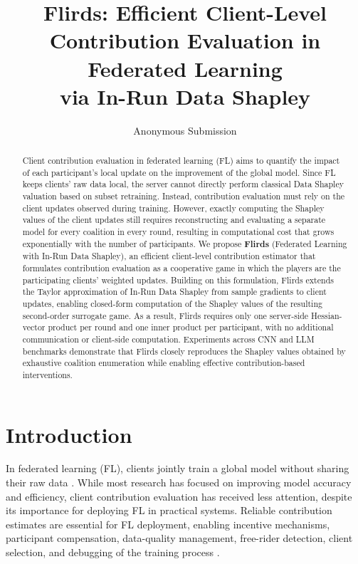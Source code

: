 \documentclass[letterpaper]{article} %
\title{Flirds: Efficient Client-Level Contribution Evaluation in Federated Learning \\ via In-Run Data Shapley}
\author{ 
    Anonymous Submission
}
\theoremstyle{definition} %
\begin{document}
\maketitle

\begin{abstract}
Client contribution evaluation in federated learning (FL) aims to quantify the impact of each participant's local update on the improvement of the global model. Since FL keeps clients' raw data local, the server cannot directly perform classical Data Shapley valuation based on subset retraining. Instead, contribution evaluation must rely on the client updates observed during training. 
However, exactly computing the Shapley values of the client updates still requires reconstructing and evaluating a separate model for every coalition in every round, resulting in computational cost that grows exponentially with the number of participants. We propose \textbf{Flirds} (Federated Learning with In-Run Data Shapley), an efficient client-level contribution
estimator that formulates contribution evaluation as a cooperative game in which the players are the participating clients' weighted updates. Building on this formulation, Flirds extends the Taylor approximation of In-Run Data Shapley from sample gradients to client updates, enabling closed-form computation of the Shapley values of the resulting second-order surrogate game. As a result, Flirds requires only one server-side Hessian-vector product per round and one inner product per participant, with no additional communication or client-side computation.
Experiments across CNN and LLM benchmarks demonstrate that Flirds closely reproduces the Shapley values obtained by exhaustive coalition enumeration while enabling effective contribution-based interventions.
\end{abstract}

\section{Introduction}
\label{sec:intro}

In federated learning (FL), clients jointly train a global model without sharing their raw data \citep{mcmahan2016federated,kairouz2021advances}. While most research has focused on improving model accuracy and efficiency, client contribution evaluation has received less attention, despite its importance for deploying FL in practical systems. Reliable contribution estimates are essential for FL deployment, enabling incentive mechanisms, participant compensation, data-quality management, free-rider detection, client selection, and debugging of the training process \citep{zhang2025incentivizing,du2025feddqc,huang2021shapley}.
\end{document}
